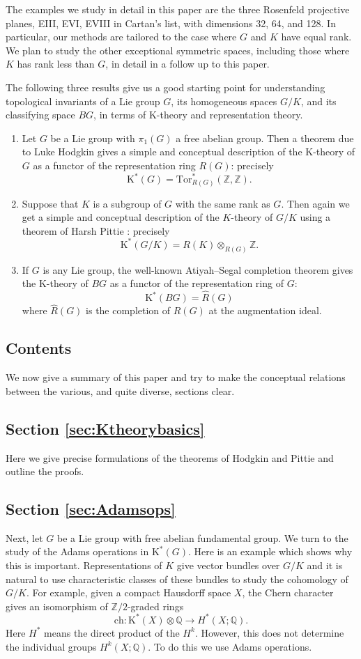 \documentclass[twoside,a4paper,reqno,11pt]{amsart}
\newcommand{\K}{\mathrm{K}}
\newcommand{\Q}{\mathbb{Q}}
\newcommand{\Z}{\mathbb{Z}}
\renewcommand{\o}{\otimes}
\newcommand{\Tor}{\mathrm{Tor}}
\newcommand{\ch}{\mathrm{ch}}
\begin{document}
The examples we study in detail in this paper are the three Rosenfeld projective planes, EIII, EVI, EVIII in Cartan's list, with dimensions 32, 64, and 128. In particular, our methods are tailored to the case where $G$ and $K$ have equal rank. We plan to study the other exceptional symmetric spaces, including those where $K$ has rank less than $G$, in detail in a follow up to this paper.

The following three results give us a good starting point for understanding topological invariants of a Lie group $G$, its homogeneous spaces $G/K$, and its classifying space $BG$, in terms of $\K$-theory and representation theory. 
\begin{enumerate}
\item
Let $G$ be a Lie group with $\pi_1(G)$ a free abelian group.  Then a theorem due to Luke Hodgkin \cite[p.~85]{MR0478156} gives a simple and conceptual description of the $\K$-theory of $G$ as a functor of the representation ring $R(G)$: precisely 
$$
\K^*(G) = \Tor^*_{R(G)}(\Z, \Z).
$$ 
\item 
Suppose that $K$ is a subgroup of $G$ with the same rank as $G$.  Then again we get a simple and conceptual description of the $K$-theory of $G/K$ using a theorem of Harsh Pittie \cite{MR0290402}: precisely 
$$
\K^*(G/K) = R(K)\o_{R(G)}\Z.
$$ 
\item
If $G$ is any Lie group, the well-known  Atiyah--Segal completion theorem \cite{MR0259946} gives the $\K$-theory of $BG$ as a functor of the representation ring of $G$: 
$$
\K^*(BG) = \hat{R}(G)
$$ 
where $\hat{R}(G)$ is the completion of $R(G)$ at the augmentation ideal.
\end{enumerate}


\subsection*{Contents}
We now give a summary of this paper and try to make the conceptual relations between the various, and quite diverse, sections clear. 


\subsection*{Section \ref{sec:Ktheorybasics} }
Here we give precise formulations of the theorems of Hodgkin and Pittie and outline the proofs.  

\subsection*{Section \ref{sec:Adamsops}} 
Next, let $G$ be a Lie group with free abelian fundamental group.  We turn to the study of the Adams operations in $\K^*(G)$.  Here is an example which shows why this is important.  Representations of $K$ give vector bundles over $G/K$ and it is natural to use characteristic classes of these bundles to study the cohomology of $G/K$. For example, given a compact Hausdorff space $X$, the Chern character gives an isomorphism of $\Z/2$-graded rings
$$
\ch : \K^*(X)\o\Q \to  H^*(X; \Q).
$$
Here $H^*$ means the direct product of the $H^{k}$.  However, this does not determine the individual groups $H^k(X; \Q)$.  To do this we use Adams operations.  
\end{document}
